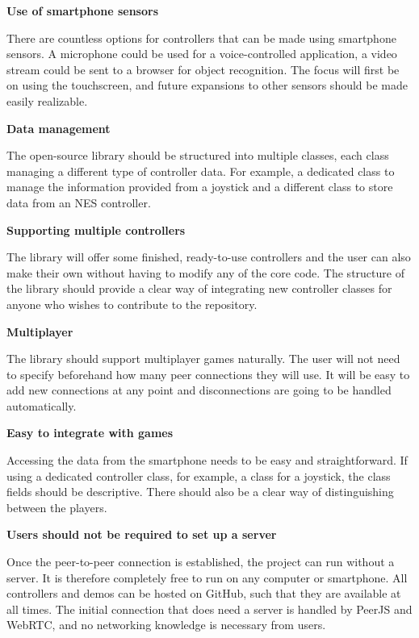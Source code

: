\documentclass{l4proj}
\begin{document}
\textbf{Use of smartphone sensors}\par
There are countless options for controllers that can be made using smartphone sensors. A microphone could be used for a voice-controlled application, a video stream could be sent to a browser for object recognition. The focus will first be on using the touchscreen, and future expansions to other sensors should be made easily realizable. \par

\textbf{Data management}\par 
The open-source library should be structured into multiple classes, each class managing a different type of controller data. For example, a dedicated class to manage the information provided from a joystick and a different class to store data from an NES controller. \par

\textbf{Supporting multiple controllers}\par
 The library will offer some finished, ready-to-use controllers and the user can also make their own without having to modify any of the core code. The structure of the library should provide a clear way of integrating new controller classes for anyone who wishes to contribute to the repository. \par
 
\textbf{Multiplayer}\par
The library should support multiplayer games naturally. The user will not need to specify beforehand how many peer connections they will use. It will be easy to add new connections at any point and disconnections are going to be handled automatically.  \par

\textbf{Easy to integrate with games}\par
Accessing the data from the smartphone needs to be easy and straightforward. If using a dedicated controller class, for example, a class for a joystick, the class fields should be descriptive. There should also be a clear way of distinguishing between the players. \par

\textbf{Users should not be required to set up a server}\par 
Once the peer-to-peer connection is established, the project can run without a server. It is therefore completely free to run on any computer or smartphone. All controllers and demos can be hosted on GitHub, such that they are available at all times. The initial connection that does need a server is handled by PeerJS and WebRTC, and no networking knowledge is necessary from users. 
\end{document}
